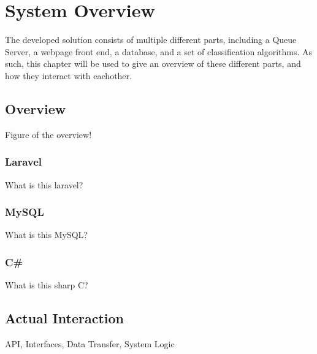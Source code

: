 \chapter{System Overview}
The developed solution consists of multiple different parts, including a Queue
Server, a webpage front end, a database, and a set of classification algorithms.
As such, this chapter will be used to give an overview of these different parts,
and how they interact with eachother.

\section{Overview}
Figure of the overview!

\subsection{Laravel}
What is this laravel?

\subsection{MySQL}
What is this MySQL?

\subsection{C\#}
What is this sharp C?

\section{Actual Interaction}
API, Interfaces, Data Transfer, System Logic

